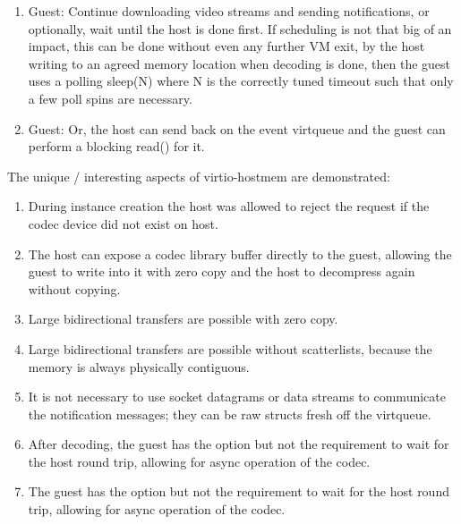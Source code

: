 \begin{enumerate}
\item Guest: Continue downloading video streams and sending notifications,
    or optionally, wait until the host is done first. If scheduling is not that
        big of an impact, this can be done without even any further VM exit, by
        the host writing to an agreed memory location when decoding is done,
        then the guest uses a polling sleep(N) where N is the correctly tuned
        timeout such that only a few poll spins are necessary.

\item Guest: Or, the host can send back on the event virtqueue 
    and the guest can perform a blocking read() for it.

\end{enumerate}

The unique / interesting aspects of virtio-hostmem are demonstrated:

\begin{enumerate}

\item During instance creation the host was allowed to reject the request if
    the codec device did not exist on host.

\item The host can expose a codec library buffer directly to the guest,
    allowing the guest to write into it with zero copy and the host to decompress again without copying.

\item Large bidirectional transfers are possible with zero copy.

\item Large bidirectional transfers are possible without scatterlists, because
    the memory is always physically contiguous.

\item It is not necessary to use socket datagrams or data streams to
    communicate the notification messages; they can be raw structs fresh off the
        virtqueue.

\item After decoding, the guest has the option but not the requirement to wait
    for the host round trip, allowing for async operation of the codec.

\item The guest has the option but not the requirement to wait for the host
    round trip, allowing for async operation of the codec.

\end{enumerate}

